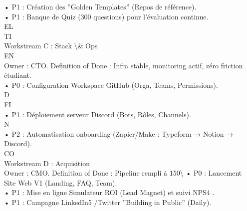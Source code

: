 • P1 : Création des ”Golden Templates” (Repos de référence).\\
\vspace{0.5em}
• P1 : Banque de Quiz (300 questions) pour l’évaluation continue.\\
\vspace{0.5em}
\vspace{0.5em}
\vspace{0.5em}
\vspace{0.5em}
EL\\
TI\\
Workstream C : Stack \textbackslash{}& Ops\\
\vspace{0.5em}
\vspace{0.5em}
\vspace{0.5em}
\vspace{0.5em}
EN\\
Owner : CTO. Definition of Done : Infra stable, monitoring actif, zéro friction étudiant.\\
\vspace{0.5em}
• P0 : Configuration Workspace GitHub (Orga, Teams, Permissions).\\
\vspace{0.5em}
\vspace{0.5em}
\vspace{0.5em}
\vspace{0.5em}
D\\
FI\\
• P1 : Déploiement serveur Discord (Bots, Rôles, Channels).\\
\vspace{0.5em}
\vspace{0.5em}
N\\
• P2 : Automatisation onboarding (Zapier/Make : Typeform → Notion → Discord).\\
CO\\
Workstream D : Acquisition\\
\vspace{0.5em}
Owner : CMO. Definition of Done : Pipeline rempli à 150\textbackslash{}%
\vspace{0.5em}
• P0 : Lancement Site Web V1 (Landing, FAQ, Team).\\
\vspace{0.5em}
• P1 : Mise en ligne Simulateur ROI (Lead Magnet) et suivi NPS4 .\\
\vspace{0.5em}
• P1 : Campagne LinkedIn5 /Twitter ”Building in Public” (Daily).\\

